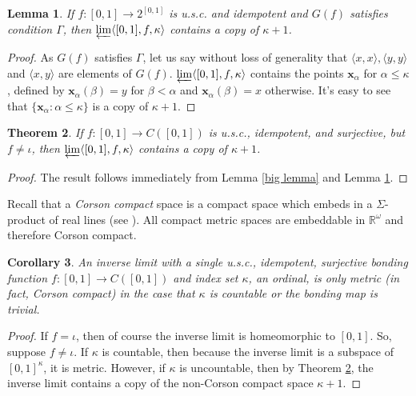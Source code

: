 \documentclass{amsart}
\newtheorem{theorem}{Theorem}[section]
\newtheorem{lemma}[theorem]{Lemma}
\newtheorem{corollary}[theorem]{Corollary}
\theoremstyle{definition}
\newcommand{\<}{\langle}
\renewcommand{\>}{\rangle}
\begin{document}
\begin{lemma} \label{general lemma}
If $f:[0,1] \to 2^{[0,1]}$ is u.s.c. and idempotent and $G(f)$ satisfies condition $\Gamma$, then $\varprojlim\<[0,1],f,\kappa\>$ contains a copy of $\kappa + 1$.
\end{lemma}

\begin{proof}
As $G(f)$ satisfies $\Gamma$, let us say without loss of generality that $\<x,x\>, \<y,y\>$ and $\<x,y\>$ are elements of $G(f)$. $\varprojlim\<[0,1],f,\kappa\>$ contains the points $\textbf{x}_\alpha$ for $\alpha\leq\kappa$, defined by $\textbf{x}_\alpha(\beta)=y$ for $\beta<\alpha$ and $\textbf{x}_\alpha(\beta)=x$ otherwise. It's easy to see that $\{\textbf{x}_\alpha:\alpha\leq\kappa\}$ is a copy of $\kappa+1$.
\end{proof}

\begin{theorem} \label{main theorem}
If $f:[0,1]\to C([0,1])$ is u.s.c., idempotent, and surjective, but $f\not=\iota$, then $\varprojlim\<[0,1],f,\kappa\>$ contains a copy of $\kappa+1$.
\end{theorem}

\begin{proof}
The result follows immediately from Lemma \ref{big lemma} and Lemma \ref{general lemma}.
\end{proof}

Recall that a \textit{Corson compact} space is a compact space which embeds in a $\Sigma$-product of real lines (see \cite{alster}). All compact metric spaces are embeddable in $\mathbb R^\omega$ and therefore Corson compact.

\begin{corollary} \label{main corr}
An inverse limit with a single u.s.c., idempotent, surjective bonding function $f: [0,1] \rightarrow C([0,1])$ and index set $\kappa$, an ordinal, is only metric (in fact, Corson compact) in the case that $\kappa$ is countable or the bonding map is trivial.
\end{corollary}

\begin{proof}
If $f = \iota$, then of course the inverse limit is homeomorphic to $[0,1]$. So, suppose $f \ne \iota$. If $\kappa$ is countable, then because the inverse limit is a subspace of $[0,1]^{\kappa}$, it is metric. However, if $\kappa$ is uncountable, then by Theorem \ref{main theorem}, the inverse limit contains a copy of the non-Corson compact space $\kappa + 1$.
\end{proof}
\end{document}
